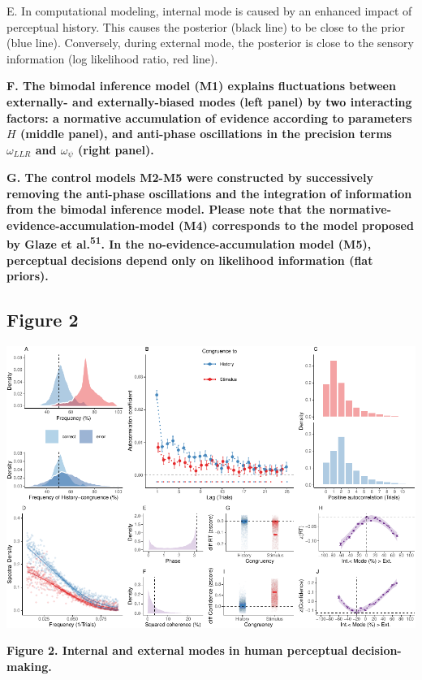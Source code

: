 \documentclass[
]{article}
\begin{document}
E. In computational modeling, internal mode is caused by an enhanced
impact of perceptual history. This causes the posterior (black line) to
be close to the prior (blue line). Conversely, during external mode, the
posterior is close to the sensory information (log likelihood ratio, red
line).

\textbf{F. The bimodal inference model (M1) explains fluctuations
between externally- and externally-biased modes (left panel) by two
interacting factors: a normative accumulation of evidence according to
parameters \(H\) (middle panel), and anti-phase oscillations in the
precision terms \(\omega_{LLR}\) and \(\omega_{\psi}\) (right panel).}

\textbf{G. The control models M2-M5 were constructed by successively
removing the anti-phase oscillations and the integration of information
from the bimodal inference model. Please note that the
normative-evidence-accumulation-model (M4) corresponds to the model
proposed by Glaze et al.\textsuperscript{51}. In the
no-evidence-accumulation model (M5), perceptual decisions depend only on
likelihood information (flat priors).}

\newpage

\hypertarget{figure-2}{%
\subsection{Figure 2}\label{figure-2}}

\includegraphics{modes_mouse_rev1b_files/figure-latex/Figure_2-1.pdf}

\textbf{Figure 2. Internal and external modes in human perceptual
decision-making.}
\end{document}
